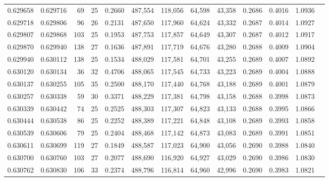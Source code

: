 \begin{tabular}{rrrrrrrrrrrrr}
0.629658 & 0.629716 &    69 &  25 &                                     0.2660 & 487,554 & 118,056 &  64,598 &  43,358 & 0.2686 & 0.4016 & 1.0936 \\
0.629718 & 0.629806 &    96 &  26 &                                     0.2131 & 487,650 & 117,960 &  64,624 &  43,332 & 0.2687 & 0.4014 & 1.0927 \\
0.629807 & 0.629868 &   103 &  25 &                                     0.1953 & 487,753 & 117,857 &  64,649 &  43,307 & 0.2687 & 0.4012 & 1.0917 \\
0.629870 & 0.629940 &   138 &  27 &                                     0.1636 & 487,891 & 117,719 &  64,676 &  43,280 & 0.2688 & 0.4009 & 1.0904 \\
0.629940 & 0.630112 &   138 &  25 &                                     0.1534 & 488,029 & 117,581 &  64,701 &  43,255 & 0.2689 & 0.4007 & 1.0892 \\
0.630120 & 0.630134 &    36 &  32 &                                     0.4706 & 488,065 & 117,545 &  64,733 &  43,223 & 0.2689 & 0.4004 & 1.0888 \\
0.630137 & 0.630255 &   105 &  35 &                                     0.2500 & 488,170 & 117,440 &  64,768 &  43,188 & 0.2689 & 0.4001 & 1.0879 \\
0.630257 & 0.630338 &    59 &  30 &                                     0.3371 & 488,229 & 117,381 &  64,798 &  43,158 & 0.2688 & 0.3998 & 1.0873 \\
0.630339 & 0.630442 &    74 &  25 &                                     0.2525 & 488,303 & 117,307 &  64,823 &  43,133 & 0.2688 & 0.3995 & 1.0866 \\
0.630444 & 0.630538 &    86 &  25 &                                     0.2252 & 488,389 & 117,221 &  64,848 &  43,108 & 0.2689 & 0.3993 & 1.0858 \\
0.630539 & 0.630606 &    79 &  25 &                                     0.2404 & 488,468 & 117,142 &  64,873 &  43,083 & 0.2689 & 0.3991 & 1.0851 \\
0.630611 & 0.630699 &   119 &  27 &                                     0.1849 & 488,587 & 117,023 &  64,900 &  43,056 & 0.2690 & 0.3988 & 1.0840 \\
0.630700 & 0.630760 &   103 &  27 &                                     0.2077 & 488,690 & 116,920 &  64,927 &  43,029 & 0.2690 & 0.3986 & 1.0830 \\
0.630762 & 0.630830 &   106 &  33 &                                     0.2374 & 488,796 & 116,814 &  64,960 &  42,996 & 0.2690 & 0.3983 & 1.0821 \\

\end{tabular}
